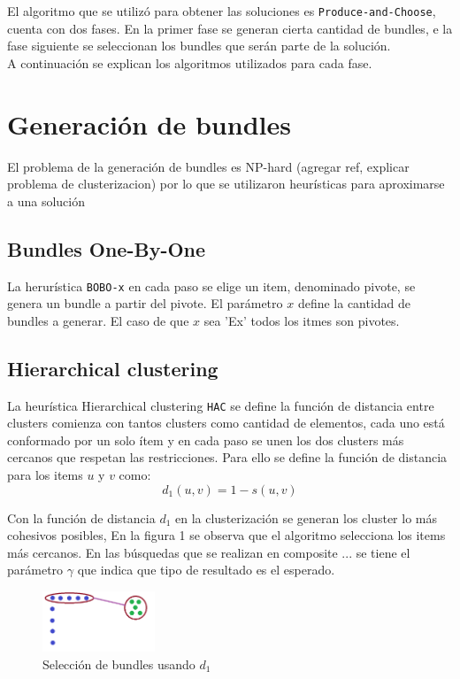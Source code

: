 El algoritmo que se utilizó para obtener las soluciones es \texttt{Produce-and-Choose}, cuenta con 
dos fases.
En la primer fase se generan cierta cantidad de bundles, e la fase siguiente se seleccionan los 
bundles que serán parte de la solución.\\
A continuación se explican los algoritmos utilizados para cada fase.
\section{Generación de bundles}
El problema de la generación de bundles es NP-hard (agregar ref, explicar problema de clusterizacion) 
por lo que se utilizaron heurísticas para aproximarse a una solución
\subsection{Bundles One-By-One}
La herurística \texttt{BOBO-x} en cada paso se elige un item, denominado pivote, se genera un bundle a partir del pivote. 
El parámetro $x$ define la cantidad de bundles a generar. El caso de que $x$ sea 'Ex' todos los itmes son pivotes.\\
\subsection{Hierarchical clustering}
La heurística Hierarchical clustering \texttt{HAC} 
se define la función de distancia entre clusters comienza con tantos clusters como cantidad de elementos, cada uno está 
conformado por un solo ítem y en cada paso se unen los dos clusters más cercanos que respetan las restricciones. 
Para ello se define la función de distancia para los items $u$ y $v$ como:\\
\begin{equation}
d_{1}(u,v) = 1 - s(u, v)
\end{equation}

Con la función de distancia $d_{1}$ en la clusterización se generan los cluster lo más cohesivos posibles,
En la figura 1 se observa que el algoritmo selecciona los items más cercanos. En las búsquedas que se realizan en composite ...
se tiene el parámetro $\gamma$ que indica que tipo de resultado es el esperado. 

\begin{figure}[H]
  \centering
    \includegraphics[width=0.3\textwidth]{img/cluster2.png}
  \caption{Selección de bundles usando $d_{1}$}
  \label{res:img-usingEfficientHAC}
\end{figure}

